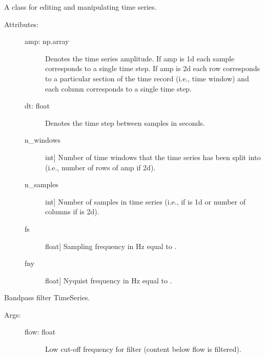 \documentclass[letterpaper,10pt,english]{sphinxmanual}
\begin{document}

\begin{fulllineitems}
\label{\detokenize{index:sigpropy.TimeSeries}}
A class for editing and manipulating time series.
\begin{description}
\item[{Attributes:}] \leavevmode\begin{description}
\item[{amp: np.array}] \leavevmode
Denotes the time series amplitude. If amp is 1d each sample
corresponds to a single time step. If amp is 2d each row 
corresponds to a particular section of the time record 
(i.e., time window) and each column corresponds to a single
time step.

\item[{dt: float }] \leavevmode
Denotes the time step between samples in seconds.

\item[{n\_windows}] \leavevmode{[}int{]}
Number of time windows that the time series has been split
into (i.e., number of rows of amp if 2d).

\item[{n\_samples}] \leavevmode{[}int{]}
Number of samples in time series (i.e.,  if 
is 1d or number of columns if  is 2d).

\item[{fs}] \leavevmode{[}float{]}
Sampling frequency in Hz equal to .

\item[{fny}] \leavevmode{[}float{]}
Nyquist frequency in Hz equal to .

\end{description}

\end{description}

\begin{fulllineitems}
\label{\detokenize{index:sigpropy.TimeSeries.bandpassfilter}}
Bandpass filter TimeSeries.
\begin{description}
\item[{Args:}] \leavevmode\begin{description}
\item[{flow: float}] \leavevmode
Low cut-off frequency for filter (content below flow is 
filtered).


\end{description}
\end{description}
\end{fulllineitems}
\end{fulllineitems}
\end{document}
